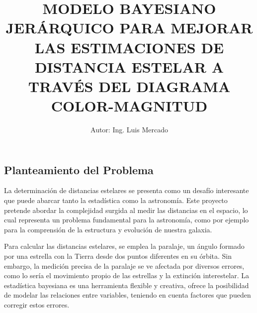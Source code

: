 \documentclass[stu, 12pt, letterpaper, donotrepeattitle, floatsintext, natbib]{apa7_ula}
\title{
    \uppercase{\large Modelo Bayesiano Jerárquico para Mejorar las 
    Estimaciones de Distancia Estelar a través del 
    Diagrama Color-Magnitud}
}
\author{Autor: Ing. Luis Mercado}
\begin{document}
\maketitle


\renewcommand\contentsname{\large{Índice}}
\tableofcontents
\setcounter{tocdepth}{2}
\newpage





\subsection{Planteamiento del Problema}

\justifying \parindent=1.5cm

La determinación de distancias estelares se presenta como un desafío
interesante que puede abarcar tanto la estadística como la astronomía.
Este proyecto pretende abordar la complejidad surgida al medir las
distancias en el espacio, lo cual representa un problema fundamental
para la astronomía, como por ejemplo para la comprensión de la estructura
y evolución de nuestra galaxia.

Para calcular las distancias estelares, se emplea la paralaje,
un ángulo formado por una estrella con la Tierra desde dos puntos
diferentes en su órbita. Sin embargo, la medición precisa de la paralaje
se ve afectada por diversos errores, como lo sería el movimiento propio
de las estrellas y la extinción interestelar. La estadística bayesiana
es una herramienta flexible y creativa, ofrece la posibilidad de modelar
las relaciones entre variables, teniendo en cuenta factores que pueden
corregir estos errores.
\end{document}
